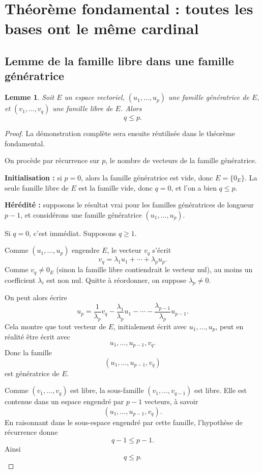 \documentclass[11pt,a4paper]{article}
\newtheorem{lemme}[definition]{Lemme}
\theoremstyle{remark}
\begin{document}
\section{Théorème fondamental : toutes les bases ont le même cardinal}

\subsection{Lemme de la famille libre dans une famille génératrice}

\begin{lemme}
Soit \(E\) un espace vectoriel, \((u_1,\dots,u_p)\) une famille génératrice de \(E\), et \((v_1,\dots,v_q)\) une famille libre de \(E\). Alors
\[
q\le p.
\]
\end{lemme}

\begin{proof}
La démonstration complète sera ensuite réutilisée dans le théorème fondamental.

On procède par récurrence sur \(p\), le nombre de vecteurs de la famille génératrice.

\textbf{Initialisation :} si \(p=0\), alors la famille génératrice est vide, donc \(E=\{0_E\}\). La seule famille libre de \(E\) est la famille vide, donc \(q=0\), et l’on a bien \(q\le p\).

\textbf{Hérédité :} supposons le résultat vrai pour les familles génératrices de longueur \(p-1\), et considérons une famille génératrice \((u_1,\dots,u_p)\).

Si \(q=0\), c’est immédiat. Supposons \(q\ge 1\).

Comme \((u_1,\dots,u_p)\) engendre \(E\), le vecteur \(v_q\) s’écrit
\[
v_q=\lambda_1u_1+\cdots+\lambda_pu_p.
\]
Comme \(v_q\neq 0_E\) (sinon la famille libre contiendrait le vecteur nul), au moins un coefficient \(\lambda_i\) est non nul. Quitte à réordonner, on suppose \(\lambda_p\neq 0\).

On peut alors écrire
\[
u_p=\frac{1}{\lambda_p}v_q-\frac{\lambda_1}{\lambda_p}u_1-\cdots-\frac{\lambda_{p-1}}{\lambda_p}u_{p-1}.
\]
Cela montre que tout vecteur de \(E\), initialement écrit avec \(u_1,\dots,u_p\), peut en réalité être écrit avec
\[
u_1,\dots,u_{p-1},v_q.
\]
Donc la famille
\[
(u_1,\dots,u_{p-1},v_q)
\]
est génératrice de \(E\).

Comme \((v_1,\dots,v_q)\) est libre, la sous-famille \((v_1,\dots,v_{q-1})\) est libre. Elle est contenue dans un espace engendré par \(p-1\) vecteurs, à savoir
\[
(u_1,\dots,u_{p-1},v_q).
\]
En raisonnant dans le sous-espace engendré par cette famille, l’hypothèse de récurrence donne
\[
q-1\le p-1.
\]
Ainsi
\[
q\le p.
\]
\end{proof}
\end{document}
